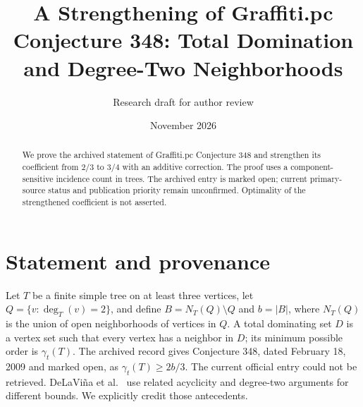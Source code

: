 \documentclass[11pt]{article}
\title{A Strengthening of Graffiti.pc Conjecture 348: Total Domination and Degree-Two Neighborhoods}
\author{Research draft for author review}
\date{November 2026}
\begin{document}
\maketitle
\begin{abstract}
We prove the archived statement of Graffiti.pc Conjecture 348 and strengthen its coefficient from $2/3$ to $3/4$ with an additive correction. The proof uses a component-sensitive incidence count in trees. The archived entry is marked open; current primary-source status and publication priority remain unconfirmed. Optimality of the strengthened coefficient is not asserted.
\end{abstract}
\section{Statement and provenance}
Let $T$ be a finite simple tree on at least three vertices, let $Q=\{v:\deg_T(v)=2\}$, and define $B=N_T(Q)\setminus Q$ and $b=|B|$, where $N_T(Q)$ is the union of open neighborhoods of vertices in $Q$. A total dominating set $D$ is a vertex set such that every vertex has a neighbor in $D$; its minimum possible order is $\gamma_t(T)$. The archived record \cite{archive} gives Conjecture 348, dated February 18, 2009 and marked open, as $\gamma_t(T)\ge 2b/3$. The current official entry \cite{wow} could not be retrieved. DeLaVi\~na et al.\ \cite[Lemmas 8 and 10, Theorem 9]{related} use related acyclicity and degree-two arguments for different bounds. We explicitly credit those antecedents.
\end{document}

